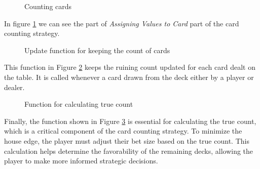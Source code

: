 \documentclass[a4paper,12pt]{report}
\begin{document}
\begin{figure}[H]
\caption{Counting cards}
\label{alg:running_count}
\end{figure}

In figure \ref{alg:running_count} we can see the part of \textit{Assigning Values to Card} part of the card counting strategy.

\begin{figure}[H]
\caption{Update function for keeping the count of cards}
\label{alg:update_running_count}
\end{figure}

This function in Figure \ref{alg:update_running_count} keeps the ruining count updated for each card dealt on the table. It is called whenever a card drawn from the deck either by a player or dealer.

\begin{figure}[H]
\caption{Function for calculating true count}
\label{alg:calcualte_true_count1}
\end{figure}

Finally, the function shown in Figure \ref{alg:calcualte_true_count1} is essential for calculating the true count, which is a critical component of the card counting strategy. To minimize the house edge, the player must adjust their bet size based on the true count. This calculation helps determine the favorability of the remaining decks, allowing the player to make more informed strategic decisions.
\end{document}
